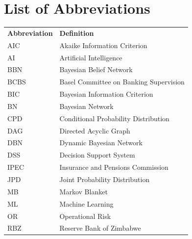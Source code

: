 \documentclass[12pt,a4paper]{extreport}
\begin{document}
\chapter*{List of Abbreviations}
\begin{table}[h!]
\begin{tabular}{ll}
\textbf{Abbreviation} & \textbf{Definition} \\
AIC & Akaike Information Criterion \\
AI & Artificial Intelligence \\
BBN & Bayesian Belief Network \\
BCBS & Basel Committee on Banking Supervision \\
BIC & Bayesian Information Criterion \\
BN & Bayesian Network \\
CPD & Conditional Probability Distribution \\
DAG & Directed Acyclic Graph \\
DBN & Dynamic Bayesian Network \\
DSS & Decision Support System \\
IPEC & Insurance and Pensions Commission \\
JPD & Joint Probability Distribution \\
MB & Markov Blanket \\
ML & Machine Learning \\
OR & Operational Risk \\
RBZ & Reserve Bank of Zimbabwe \\
\end{tabular}
\end{table}


\newpage
\tableofcontents
\newpage
\listoffigures
{}
\thispagestyle{empty}











\printbibliography



 
\end{document}
